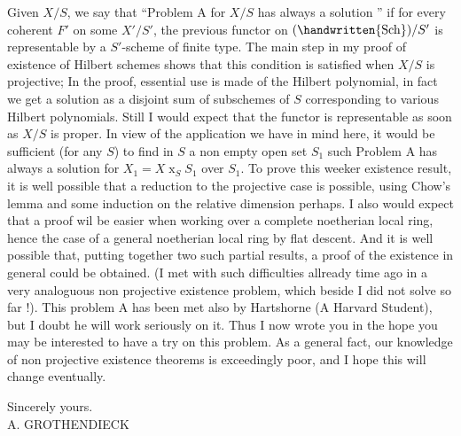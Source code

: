 Given $X/S$, we say that ``Problem A for $X/S$ has always a solution '' if for every coherent $F'$ on some $X'/S'$, the previous functor on $(\handwritten{\mathrm{Sch}})/S'$ is representable by a $S'$-scheme of finite type. The main step in my proof of existence of Hilbert schemes shows that this condition is satisfied when $X/S$ is projective; In the proof, essential use is made of the Hilbert polynomial, in fact we get a solution as a disjoint sum of subschemes of $S$ corresponding to various Hilbert polynomials. Still I would expect that the functor is representable as soon as $X/S$ is proper. In view of the application we have in mind here, it would be sufficient (for any  $S$) to find in $S$ a non empty open set $S_{1}$ such Problem A has always a solution for $X_{1}=X\mathbin{x}_{S}S_{1}$ over $S_{1}$. To prove this weeker existence result, it is well possible that a reduction to the projective case is possible, using Chow's lemma and some induction on the relative dimension perhaps. I also would expect that a proof wil be easier when working over a complete noetherian local ring, hence the case of a general noetherian local ring by flat descent. And it is well possible that, putting together two such partial results, a proof of the existence in general could be obtained. (I met with such difficulties allready time ago in a very analoguous non projective existence problem, which beside I did not solve so far !). This problem A has been met also by Hartshorne (A Harvard Student), but I doubt he will work seriously on it. Thus I now wrote you in the hope you may be interested to have a try on this problem. As a general fact, our knowledge of non projective existence theorems is exceedingly poor, and I hope this will change eventually.

Sincerely yours.\\

A. GROTHENDIECK\\

